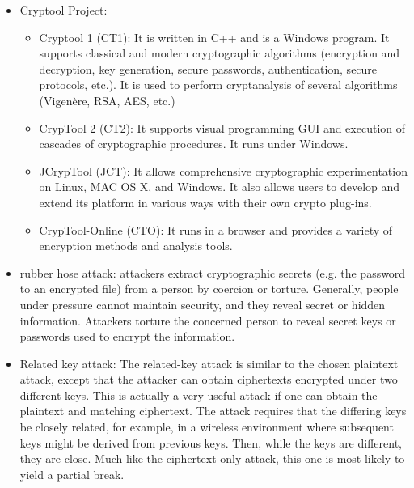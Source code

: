 \begin{itemize}
    \item Cryptool Project:
    \begin{itemize}
        \item Cryptool 1 (CT1): It is written in C++ and is a Windows program. It supports classical and modern cryptographic algorithms (encryption and decryption, key generation, secure passwords, authentication, secure protocols, etc.). It is used to perform cryptanalysis of several algorithms (Vigenère, RSA, AES, etc.)
        \item CrypTool 2 (CT2): It supports visual programming GUI and execution of cascades of cryptographic procedures. It runs under Windows.
        \item JCrypTool (JCT): It allows comprehensive cryptographic experimentation on Linux, MAC OS X, and Windows. It also allows users to develop and extend its platform in various ways with their own crypto plug-ins.
        \item CrypTool-Online (CTO): It runs in a browser and provides a variety of encryption methods and analysis tools.
    \end{itemize}
    \item rubber hose attack: attackers extract cryptographic secrets (e.g. the password to an encrypted file) from a person by coercion or torture. Generally, people under pressure cannot maintain security, and they reveal secret or hidden information. Attackers torture the concerned person to reveal secret keys or passwords used to encrypt the information.
    \item Related key attack: The related-key attack is similar to the chosen plaintext attack, except that the attacker can obtain ciphertexts encrypted under two different keys. This is actually a very useful attack if one can obtain the plaintext and matching ciphertext. The attack requires that the differing keys be closely related, for example, in a wireless environment where subsequent keys might be derived from previous keys. Then, while the keys are different, they are close. Much like the ciphertext-only attack, this one is most likely to yield a partial break.
\end{itemize}


